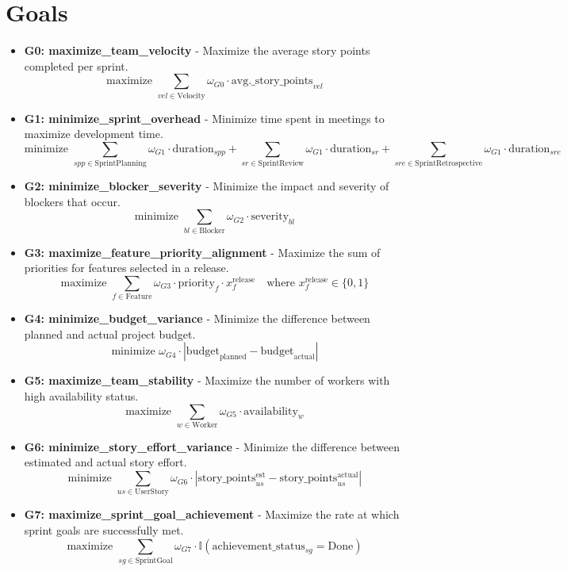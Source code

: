 \documentclass[11pt]{article}
\begin{document}
\section{Goals}
\begin{itemize}
    \item \textbf{G0: maximize\_team\_velocity} - Maximize the average story points completed per sprint.
        \[ \text{maximize } \sum_{vel \in \text{Velocity}} \omega_{G0} \cdot \text{avg.\_story\_points}_{vel} \]
    \item \textbf{G1: minimize\_sprint\_overhead} - Minimize time spent in meetings to maximize development time.
        \[ \text{minimize } \sum_{spp \in \text{SprintPlanning}} \omega_{G1} \cdot \text{duration}_{spp} + \sum_{sr \in \text{SprintReview}} \omega_{G1} \cdot \text{duration}_{sr} + \sum_{sre \in \text{SprintRetrospective}} \omega_{G1} \cdot \text{duration}_{sre} \]
    \item \textbf{G2: minimize\_blocker\_severity} - Minimize the impact and severity of blockers that occur.
        \[ \text{minimize } \sum_{bl \in \text{Blocker}} \omega_{G2} \cdot \text{severity}_{bl} \]
    \item \textbf{G3: maximize\_feature\_priority\_alignment} - Maximize the sum of priorities for features selected in a release.
        \[ \text{maximize } \sum_{f \in \text{Feature}} \omega_{G3} \cdot \text{priority}_{f} \cdot x^{\text{release}}_{f} \quad \text{where } x^{\text{release}}_{f} \in \{0,1\} \]
    \item \textbf{G4: minimize\_budget\_variance} - Minimize the difference between planned and actual project budget.
        \[ \text{minimize } \omega_{G4} \cdot | \text{budget}_{\text{planned}} - \text{budget}_{\text{actual}} | \]
    \item \textbf{G5: maximize\_team\_stability} - Maximize the number of workers with high availability status.
        \[ \text{maximize } \sum_{w \in \text{Worker}} \omega_{G5} \cdot \text{availability}_{w} \]
    \item \textbf{G6: minimize\_story\_effort\_variance} - Minimize the difference between estimated and actual story effort.
        \[ \text{minimize } \sum_{us \in \text{UserStory}} \omega_{G6} \cdot | \text{story\_points}^{\text{est}}_{us} - \text{story\_points}^{\text{actual}}_{us} | \]
    \item \textbf{G7: maximize\_sprint\_goal\_achievement} - Maximize the rate at which sprint goals are successfully met.
        \[ \text{maximize } \sum_{sg \in \text{SprintGoal}} \omega_{G7} \cdot \mathbb{I}(\text{achievement\_status}_{sg} = \text{Done}) \]

\end{itemize}
\end{document}
